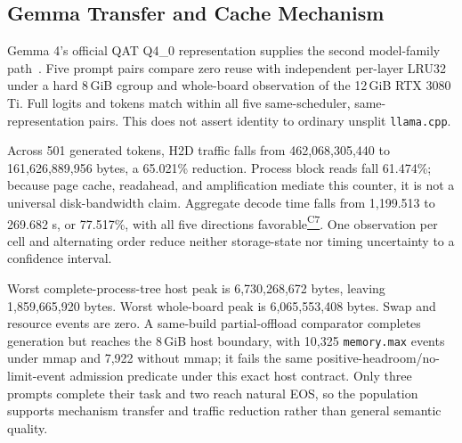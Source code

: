 \documentclass[letterpaper,twocolumn,10pt]{article}
\newcommand{\GiB}{\,GiB\xspace}
\newcommand{\claimref}[1]{\hyperlink{claim:#1}{\textsuperscript{\textsf{#1}}}}
\begin{document}
{\subsection{Gemma Transfer and Cache Mechanism}
\label{sec:gemma}

Gemma 4's official QAT Q4\_0 representation supplies the second model-family
path~\cite{gemma4report}.  Five prompt pairs compare zero reuse with independent
per-layer LRU32 under a hard 8\GiB cgroup and whole-board observation of the
12\GiB RTX 3080 Ti.  Full logits and tokens match within all five same-scheduler,
same-representation pairs.  This does not assert identity to ordinary unsplit
\texttt{llama.cpp}.

Across 501 generated tokens, H2D traffic falls from 462,068,305,440 to
161,626,889,956 bytes, a 65.021\% reduction.  Process block reads fall 61.474\%;
because page cache, readahead, and amplification mediate this counter, it is not
a universal disk-bandwidth claim.  Aggregate decode time falls from 1,199.513
to 269.682 s, or 77.517\%, with all five directions
favorable\claimref{C7}.  One observation
per cell and alternating order reduce neither storage-state nor timing
uncertainty to a confidence interval.

Worst complete-process-tree host peak is 6,730,268,672 bytes, leaving
1,859,665,920 bytes.
Worst whole-board peak is 6,065,553,408 bytes.  Swap and resource events are
zero.  A same-build partial-offload comparator completes generation but reaches
the 8\GiB host boundary, with 10,325 \texttt{memory.max} events under mmap and
7,922 without mmap; it fails the same positive-headroom/no-limit-event admission
predicate under this exact host contract.  Only
three prompts complete their task and two reach natural EOS, so the population
supports mechanism transfer and traffic reduction rather than general semantic
quality.

}
\end{document}
